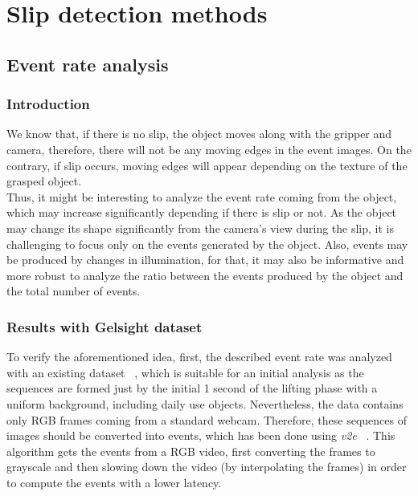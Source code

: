 \cleardoublepage
\chapter{Slip detection methods}\label{sec:methods}

\section{Event rate analysis}

\subsection{Introduction}

We know that, if there is no slip, the object moves along with the gripper and camera, therefore, there will not be any moving edges in the event images. On the contrary, if slip occurs, moving edges will appear depending on the texture of the grasped object.\\

Thus, it might be interesting to analyze the event rate coming from the object, which may increase significantly depending if there is slip or not. As the object may change its shape significantly from the camera's view during the slip, it is challenging to focus only on the events generated by the object. Also, events may be produced by changes in illumination, for that, it may also be informative and more robust to analyze the ratio between the events produced by the object and the total number of events.

\subsection{Results with Gelsight dataset}

To verify the aforementioned idea, first, the described event rate was analyzed with an existing dataset ~\cite{gelsight2018}, which is suitable for an initial analysis as the sequences are formed just by the initial 1 second of the lifting phase with a uniform background, including daily use objects. Nevertheless, the data contains only RGB frames coming from a standard webcam. Therefore, these sequences of images should be converted into events, which has been done using \textit{v2e} ~\cite{v2e}. This algorithm gets the events from a RGB video, first converting the frames to grayscale and then slowing down the video (by interpolating the frames) in order to compute the events with a lower latency.\\

